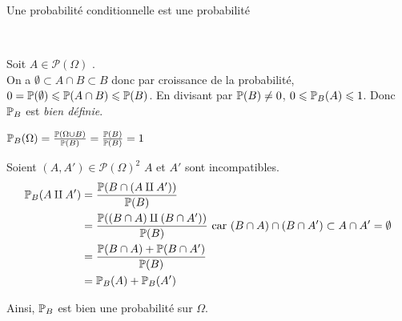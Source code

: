 \documentclass{article}
\begin{document}
		{Une probabilité conditionnelle est une probabilité}
		
		~\\
		\begin{liste}
			\item Soit $A \in \mathcal{P}(\Omega)$ \fq. \\
			On a $\emptyset \subset A \cap B  \subset B$ donc par croissance de la probabilité, $0 = \mathbb P(\emptyset) \leqslant \mathbb P(A \cap B) \leqslant \mathbb P(B)$.
			En divisant par $\mathbb P(B) \neq 0$, $0 \leqslant \mathbb P_B(A) \leqslant 1$. Donc $\mathbb P_B$ est \textit{bien définie}.
			\item $\mathbb P_B(\Omega)
			= \frac{\mathbb P(\Omega \cup B)}{\mathbb P(B)}
			= \frac{\mathbb P(B)}{\mathbb P(B)}
			= 1$
			\item Soient $(A, A') \in \mathcal{P}(\Omega)^2$ \fq* \tq* $A$ et $A'$ sont incompatibles.
			\begin{equation}
				\begin{aligned}
					\mathbb P_B(A \amalg A')
					&= \frac{ \mathbb P(B \cap (A \amalg A') ) }{ \mathbb P(B) } \\
					&= \frac{ \mathbb P( (B \cap A) \amalg (B \cap A') ) }{ \mathbb P(B) } \text{ car } (B \cap A) \cap (B \cap A') \subset A \cap A' = \emptyset \\
					&= \frac{ \mathbb P(B \cap A) + \mathbb P(B \cap A') }{ \mathbb P(B) } \\
					&= \mathbb P_B(A) + \mathbb P_B(A')
				\end{aligned}
			\end{equation}
		\end{liste}
		Ainsi, $\mathbb P_B$ est bien une probabilité sur $\Omega$.
	\end{question_kholle}
\end{document}
